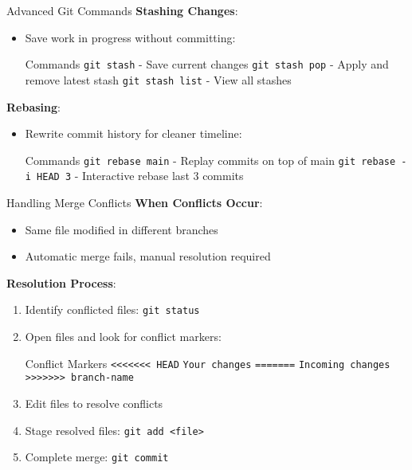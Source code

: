 \documentclass{beamer}
\begin{document}
\begin{frame}{Advanced Git Commands}
  \textbf{Stashing Changes}:
  \begin{itemize}
    \item Save work in progress without committing:
    \begin{block}{Commands}
      \texttt{git stash} - Save current changes\newline
      \texttt{git stash pop} - Apply and remove latest stash\newline
      \texttt{git stash list} - View all stashes
    \end{block}
  \end{itemize}
  
  \textbf{Rebasing}:
  \begin{itemize}
    \item Rewrite commit history for cleaner timeline:
    \begin{block}{Commands}
      \texttt{git rebase main} - Replay commits on top of main\newline
      \texttt{git rebase -i HEAD~3} - Interactive rebase last 3 commits
    \end{block}
  \end{itemize}
\end{frame}

\begin{frame}{Handling Merge Conflicts}
  \textbf{When Conflicts Occur}:
  \begin{itemize}
    \item Same file modified in different branches
    \item Automatic merge fails, manual resolution required
  \end{itemize}
  
  \textbf{Resolution Process}:
  \begin{enumerate}
    \item Identify conflicted files: \texttt{git status}
    \item Open files and look for conflict markers:
    \begin{block}{Conflict Markers}
      \texttt{<<<<<<< HEAD}\newline
      \texttt{Your changes}\newline
      \texttt{=======}\newline
      \texttt{Incoming changes}\newline
      \texttt{>>>>>>> branch-name}
    \end{block}
    \item Edit files to resolve conflicts
    \item Stage resolved files: \texttt{git add <file>}
    \item Complete merge: \texttt{git commit}
  \end{enumerate}
\end{frame}
\end{document}
